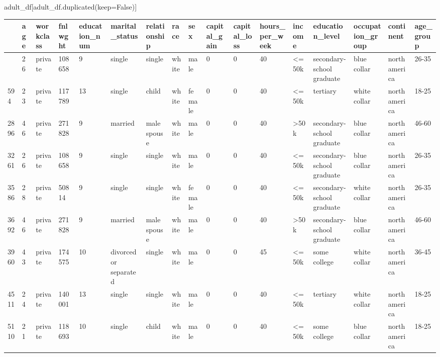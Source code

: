 \documentclass[
  letterpaper,
  DIV=11,
  numbers=noendperiod]{scrartcl}
\newenvironment{Shaded}{\begin{snugshade}}{\end{snugshade}}
\newcommand{\NormalTok}[1]{\textcolor[rgb]{0.00,0.23,0.31}{#1}}
\newcommand{\OperatorTok}[1]{\textcolor[rgb]{0.37,0.37,0.37}{#1}}
\newcommand{\VariableTok}[1]{\textcolor[rgb]{0.07,0.07,0.07}{#1}}
\begin{document}
\begin{Shaded}
\begin{Highlighting}[]
\NormalTok{adult\_df[adult\_df.duplicated(keep}\OperatorTok{=}\VariableTok{False}\NormalTok{)]}
\end{Highlighting}
\end{Shaded}

\begin{longtable}[]{@{}lllllllllllllllll@{}}
\toprule\noalign{}
& age & workclass & fnlwght & education\_num & marital\_status &
relationship & race & sex & capital\_gain & capital\_loss &
hours\_per\_week & income & education\_level & occupation\_group &
continent & age\_group \\
\midrule\noalign{}
\endhead
\bottomrule\noalign{}
\endlastfoot
531 & 26 & private & 108658 & 9 & single & single & white & male & 0 & 0
& 40 & \textless=50k & secondary-school graduate & blue collar & north
america & 26-35 \\
594 & 23 & private & 117789 & 13 & single & child & white & female & 0 &
0 & 40 & \textless=50k & tertiary & white collar & north america &
18-25 \\
2896 & 46 & private & 271828 & 9 & married & male spouse & white & male
& 0 & 0 & 40 & \textgreater50k & secondary-school graduate & blue collar
& north america & 46-60 \\
3261 & 26 & private & 108658 & 9 & single & single & white & male & 0 &
0 & 40 & \textless=50k & secondary-school graduate & blue collar & north
america & 26-35 \\
3586 & 28 & private & 50814 & 9 & single & single & white & female & 0 &
0 & 40 & \textless=50k & secondary-school graduate & white collar &
north america & 26-35 \\
3692 & 46 & private & 271828 & 9 & married & male spouse & white & male
& 0 & 0 & 40 & \textgreater50k & secondary-school graduate & blue collar
& north america & 46-60 \\
3960 & 43 & private & 174575 & 10 & divorced or separated & single &
white & male & 0 & 0 & 45 & \textless=50k & some college & white collar
& north america & 36-45 \\
4511 & 24 & private & 140001 & 13 & single & single & white & male & 0 &
0 & 40 & \textless=50k & tertiary & white collar & north america &
18-25 \\
5110 & 21 & private & 118693 & 10 & single & child & white & male & 0 &
0 & 40 & \textless=50k & some college & blue collar & north america &
18-25 \\

\end{longtable}
\end{document}
